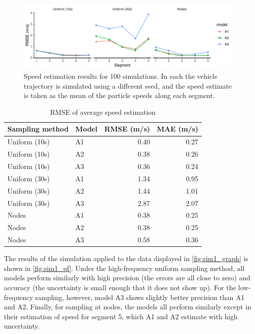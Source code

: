 \begin{knitrout}\small
{}\color{fgcolor}\begin{figure}
\includegraphics[width=\maxwidth]{figure/sim1_pf_full-1} \caption[Speed estimation results for 100 simulations]{Speed estimation results for 100 simulations. In each the vehicle trajectory is simulated using a different seed, and the speed estimate is taken as the mean of the particle speeds along each segment.}\label{fig:sim1_pf_full}
\end{figure}

\begin{table}

\caption{\label{tab:sim1_pf_full}RMSE of average speed estimation}
\centering
\begin{tabular}[t]{llrr}
\toprule
Sampling method & Model & RMSE (m/s) & MAE (m/s)\\
\midrule
Uniform (10s) & A1 & 0.40 & 0.27\\
Uniform (10s) & A2 & 0.38 & 0.26\\
Uniform (10s) & A3 & 0.36 & 0.24\\
\midrule
Uniform (30s) & A1 & 1.34 & 0.95\\
Uniform (30s) & A2 & 1.44 & 1.01\\
Uniform (30s) & A3 & 2.87 & 2.07\\
\midrule
Nodes & A1 & 0.38 & 0.25\\
Nodes & A2 & 0.38 & 0.25\\
Nodes & A3 & 0.58 & 0.36\\
\bottomrule
\end{tabular}
\end{table}


\end{knitrout}

The results of the simulation applied to the data displayed in \cref{fig:sim1_graph} is shown in \cref{fig:sim1_pf}. Under the high-frequency uniform sampling method, all models perform similarly with high precision (the errors are all close to zero) and accuracy (the uncertainty is small enough that it does not show up). For the low-frequency sampling, however, model A3 shows slightly better precision than A1 and A2. Finally, for sampling at nodes, the models all perform similarly except in their estimation of speed for segment 5, which A1 and A2 estimate with high uncertainty.


